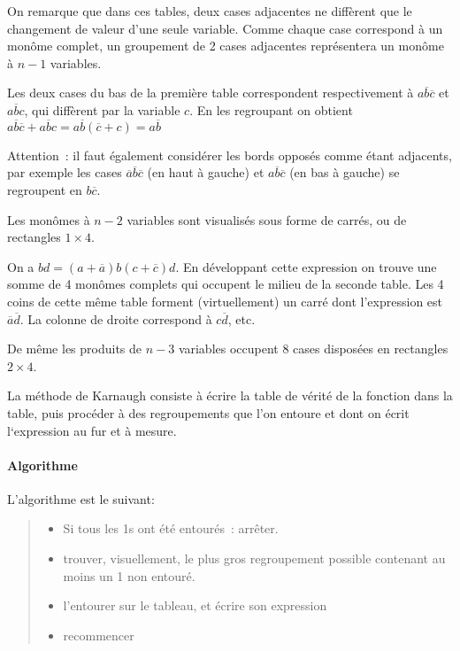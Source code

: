 On remarque que dans ces tables, deux cases adjacentes ne diffèrent
que le changement de valeur d'une seule variable. Comme chaque case
correspond \`a un mon\^ome complet, un groupement de 2 cases
adjacentes repr\'esentera un mon\^ome \`a $n-1$ variables.

\begin{exemple}{} Les deux cases du bas de la premi\`ere table correspondent 
respectivement \`a $a\overline{b}\overline{c}$ et $a\overline{b}c$, 
qui diff\`erent par la variable $c$. En les regroupant  on obtient
 $a\overline{b}\overline{c} + a\overline{b}c = a\overline{b}(\overline{c}+c)
= a\overline{b}$
\end{exemple}

Attention~: il faut \'egalement consid\'erer les bords oppos\'es comme \'etant adjacents,
par exemple les cases $\overline{a}\overline{b}\overline{c}$ 
(en haut \`a gauche) et $a\overline{b}\overline{c}$ (en bas \`a gauche) se
regroupent en $b\overline{c}$.

Les mon\^omes \`a $n-2$ variables sont visualis\'es sous forme de carr\'es,
ou de rectangles $1 \times 4$.  

\begin{exemple}{} On a $bd = (a + \overline{a})b(c +\overline{c})d$. En d\'eveloppant
cette expression on trouve une somme de 4 mon\^omes complets qui occupent le
milieu de la seconde table.  Les 4 coins de cette m\^eme table forment
(virtuellement) un carr\'e dont l'expression est $\overline{a}\overline{d}$.
La colonne de droite  correspond \`a $c\overline{d}$, etc.
\end{exemple}

De m\^eme les produits de $n-3$ variables occupent 8 cases dispos\'ees
en rectangles $ 2 \times 4$.

La m\'ethode de Karnaugh consiste \`a 
 \'ecrire la table de v\'erit\'e de la fonction dans la table, puis
proc\'eder \`a des regroupements que l'on entoure et dont on \'ecrit
l`expression au fur et \`a mesure.


\paragraph{Algorithme} L'algorithme est le suivant:
\begin{quote}
\begin{itemize}
\item  Si tous les 1s ont \'et\'e entour\'es~: arr\^eter.
\item trouver, visuellement, le plus gros regroupement possible
      contenant au moins un 1 non entour\'e.
\item l'entourer sur le tableau, et \'ecrire son expression
\item recommencer
\end{itemize}
\end{quote}

